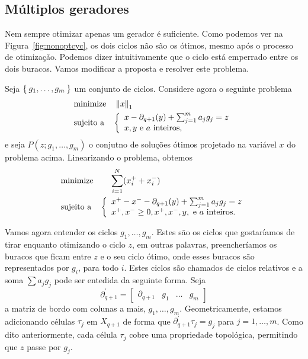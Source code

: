 \subsection{Múltiplos geradores}
Nem sempre otimizar apenas um gerador é suficiente. Como podemos ver na Figura~\ref{fig:nonoptcyc},
os dois ciclos não são os ótimos, mesmo após o processo de otimização. Podemos dizer intuitivamente
que o ciclo está emperrado entre os dois buracos. Vamos modificar a proposta e resolver este problema. 

Seja $\Set{g_1, \dots, g_m}$ um conjunto de ciclos. Considere agora o seguinte problema
\begin{equation*}
    \begin{split}
        &\text{minimize} \quad \left\lVert x\right\rVert_1 \\
        &\text{sujeito a} \quad \left \{ \begin{array}{l}
            x- \partial_{q+1}(y) + \sum_{j=1}^m a_j g_j = z \\
            x, y \text{ e } a \text{ inteiros,}
        \end{array} \right.
    \end{split}
\end{equation*}
e seja $P(z;g_1, \dots, g_m)$ o conjutno de soluções ótimos projetado na variável
$x$ do problema acima. Linearizando o problema, obtemos
 \begin{equation*}
    \begin{split}
        &\text{minimize} \quad \quad  \sum_{i=1}^N (x^+_i + x^-_i) \\
        &\text{sujeito a} \quad \left \{ \begin{array}{l}
            x^+ - x^- - \partial_{q+1}(y) + \sum_{j=1}^m a_j g_j = z \\
            x^+, x^- \geq 0, x^+, x^-, y, \text{ e } a \text{ inteiros.}
        \end{array} \right.
    \end{split}
\end{equation*}

Vamos agora entender os ciclos $g_1, \dots, g_m$. Estes são os ciclos que 
gostaríamos de tirar enquanto otimizando o ciclo $z$, em outras palavras,
preencheríamos os buracos que ficam entre $z$ e o seu ciclo ótimo,
onde esses buracos são representados por $g_i$, para todo $i$. Estes ciclos
são chamados de ciclos relativos e a soma $\sum a_j g_j$ pode ser entedida
da seguinte forma. Seja 
\begin{equation*}
    \partial^{'}_{q+1} = \begin{bmatrix} \partial_{q+1} & g_1 & \dots & g_m \end{bmatrix}
\end{equation*}
a matriz de bordo com colunas a mais, $g_1, \dots, g_m$. Geometricamente, estamos
adicionando células $\tau_j$ em $X_{q+1}$ de forma que $\partial^{'}_{q+1} \tau_j 
= g_j$ para $j=1,\dots,m$. Como dito anteriormente, cada célula $\tau_j$ cobre
uma propriedade topológica, permitindo que $z$ passe por $g_j$. 

